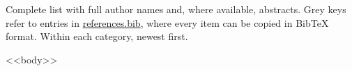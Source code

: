 \documentclass[11pt, a4paper]{cvClass}
\begin{document}
\makecvheader[C]
\par\vspace{4mm}
{\fontsize{9pt}{11pt}\bodyfontlight\color{graytext}
Complete list with full author names and, where available, abstracts. Grey keys refer to entries in
\href{https://<<website>>/publications/references.bib}{references.bib}, where every item can be copied in BibTeX format.
Within each category, newest first.\par}

<<body>>
\end{document}
